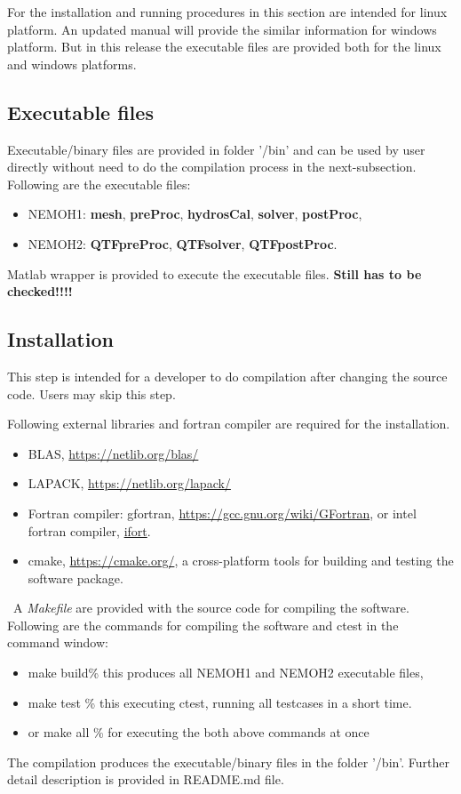 \documentclass[12pt,a4paper,titlepage]{article}
\begin{document}
For the installation and running procedures in this section are intended for linux platform. An updated manual will provide the similar information for windows platform. But in this release the executable files are provided both for the linux and windows platforms.

\subsection{Executable files}\label{Sec:Execute}
Executable/binary files are provided in folder '/bin' and can be used by user directly without need to do the compilation process in the next-subsection. Following are the executable files:
\begin{itemize}
\item NEMOH1: \textbf{mesh}, \textbf{preProc}, \textbf{hydrosCal}, \textbf{solver}, \textbf{postProc},
\item NEMOH2: \textbf{QTFpreProc}, \textbf{QTFsolver}, \textbf{QTFpostProc}.
\end{itemize}
Matlab wrapper is provided to execute the executable files. \textbf{\color{red}Still has to be checked!!!!}

\subsection{Installation}
This step is intended for a developer to do compilation after changing the source code. Users may skip this step.

Following external libraries and fortran compiler are required for the installation.
\begin{itemize}
    \item BLAS, \url{https://netlib.org/blas/}
    \item LAPACK, \url{https://netlib.org/lapack/}
    \item Fortran compiler: gfortran, \url{https://gcc.gnu.org/wiki/GFortran}, or intel fortran compiler, \href{https://www.intel.com/content/www/us/en/developer/tools/oneapi/fortran-compiler.html#gs.jik1s6}{ifort}.
    \item cmake, \url{https://cmake.org/}, a cross-platform tools for building and testing the software package.
\end{itemize}
\
A \textit{Makefile} are provided with the source code for compiling the software. Following are the commands for compiling the software and ctest in the command window:
\begin{itemize}
\item make build\hspace{1.5cm}\% this produces all NEMOH1 and NEMOH2 executable files,
\item make test  \hspace{1.5cm}\% this executing ctest, running all testcases in a short time.
\item or make all  \hspace{1.2cm}\% for executing the both above commands at once
\end{itemize}
The compilation produces the executable/binary files in the folder '/bin'.
Further detail description is provided in README.md file.
\end{document}

